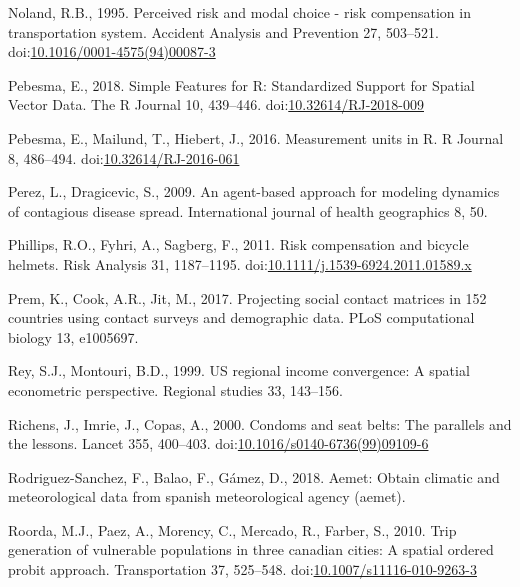 \documentclass[]{elsarticle} %
\begin{document}
\leavevmode\hypertarget{ref-Noland1995perceived}{}%
Noland, R.B., 1995. Perceived risk and modal choice - risk compensation
in transportation system. Accident Analysis and Prevention 27, 503--521.
doi:\href{https://doi.org/10.1016/0001-4575(94)00087-3}{10.1016/0001-4575(94)00087-3}

\leavevmode\hypertarget{ref-Pebesma2018}{}%
Pebesma, E., 2018. Simple Features for R: Standardized Support for
Spatial Vector Data. The R Journal 10, 439--446.
doi:\href{https://doi.org/10.32614/RJ-2018-009}{10.32614/RJ-2018-009}

\leavevmode\hypertarget{ref-Pebesma2016}{}%
Pebesma, E., Mailund, T., Hiebert, J., 2016. Measurement units in R. R
Journal 8, 486--494.
doi:\href{https://doi.org/10.32614/RJ-2016-061}{10.32614/RJ-2016-061}

\leavevmode\hypertarget{ref-Perez2009agent}{}%
Perez, L., Dragicevic, S., 2009. An agent-based approach for modeling
dynamics of contagious disease spread. International journal of health
geographics 8, 50.

\leavevmode\hypertarget{ref-Phillips2011risk}{}%
Phillips, R.O., Fyhri, A., Sagberg, F., 2011. Risk compensation and
bicycle helmets. Risk Analysis 31, 1187--1195.
doi:\href{https://doi.org/10.1111/j.1539-6924.2011.01589.x}{10.1111/j.1539-6924.2011.01589.x}

\leavevmode\hypertarget{ref-Prem2017projecting}{}%
Prem, K., Cook, A.R., Jit, M., 2017. Projecting social contact matrices
in 152 countries using contact surveys and demographic data. PLoS
computational biology 13, e1005697.

\leavevmode\hypertarget{ref-Rey1999us}{}%
Rey, S.J., Montouri, B.D., 1999. US regional income convergence: A
spatial econometric perspective. Regional studies 33, 143--156.

\leavevmode\hypertarget{ref-Richens2000risk}{}%
Richens, J., Imrie, J., Copas, A., 2000. Condoms and seat belts: The
parallels and the lessons. Lancet 355, 400--403.
doi:\href{https://doi.org/10.1016/s0140-6736(99)09109-6}{10.1016/s0140-6736(99)09109-6}

\leavevmode\hypertarget{ref-Rodriguez2018aemet}{}%
Rodriguez-Sanchez, F., Balao, F., Gámez, D., 2018. Aemet: Obtain
climatic and meteorological data from spanish meteorological agency
(aemet).

\leavevmode\hypertarget{ref-Roorda2010trip}{}%
Roorda, M.J., Paez, A., Morency, C., Mercado, R., Farber, S., 2010. Trip
generation of vulnerable populations in three canadian cities: A spatial
ordered probit approach. Transportation 37, 525--548.
doi:\href{https://doi.org/10.1007/s11116-010-9263-3}{10.1007/s11116-010-9263-3}
\end{document}
